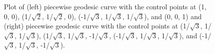 \begin{figure}

{\centering {}

}

\caption{Plot of (left) piecewise geodesic curve with the control points at (1, 0, 0), (1/$\sqrt{2}$, 1/$\sqrt{2}$, 0), (-1/$\sqrt{3}$, 1/$\sqrt{3}$, 1/$\sqrt{3}$), and (0, 0, 1) and (right) piecewise geodesic curve with the control points at (1/$\sqrt{3}$, 1/$\sqrt{3}$, 1/$\sqrt{3}$), (1/$\sqrt{3}$, 1/$\sqrt{3}$, -1/$\sqrt{3}$, (-1/$\sqrt{3}$, 1/$\sqrt{3}$, 1/$\sqrt{3}$), and (-1/$\sqrt{3}$, 1/$\sqrt{3}$, -1/$\sqrt{3}$).}\label{fig:piecewise}
\end{figure}

